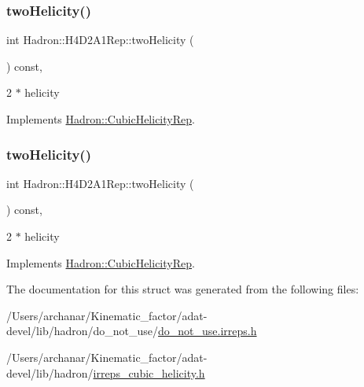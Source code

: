 \subsubsection{\texorpdfstring{twoHelicity()}{twoHelicity()}\hspace{0.1cm}{\footnotesize\ttfamily [2/3]}}
{\footnotesize\ttfamily int Hadron\+::\+H4\+D2\+A1\+Rep\+::two\+Helicity (\begin{DoxyParamCaption}{ }\end{DoxyParamCaption}) const\hspace{0.3cm}{\ttfamily [inline]}, {\ttfamily [virtual]}}

2 $\ast$ helicity 

Implements \mbox{\hyperlink{structHadron_1_1CubicHelicityRep_af507aa56fc2747eacc8cb6c96db31ecc}{Hadron\+::\+Cubic\+Helicity\+Rep}}.

\mbox{\label{structHadron_1_1H4D2A1Rep_ade522129ee7018a431237c9d04e13351}} 
\subsubsection{\texorpdfstring{twoHelicity()}{twoHelicity()}\hspace{0.1cm}{\footnotesize\ttfamily [3/3]}}
{\footnotesize\ttfamily int Hadron\+::\+H4\+D2\+A1\+Rep\+::two\+Helicity (\begin{DoxyParamCaption}{ }\end{DoxyParamCaption}) const\hspace{0.3cm}{\ttfamily [inline]}, {\ttfamily [virtual]}}

2 $\ast$ helicity 

Implements \mbox{\hyperlink{structHadron_1_1CubicHelicityRep_af507aa56fc2747eacc8cb6c96db31ecc}{Hadron\+::\+Cubic\+Helicity\+Rep}}.



The documentation for this struct was generated from the following files\+:\begin{DoxyCompactItemize}
\item 
/\+Users/archanar/\+Kinematic\+\_\+factor/adat-\/devel/lib/hadron/do\+\_\+not\+\_\+use/\mbox{\hyperlink{adat-devel_2lib_2hadron_2do__not__use_2do__not__use_8irreps_8h}{do\+\_\+not\+\_\+use.\+irreps.\+h}}\item 
/\+Users/archanar/\+Kinematic\+\_\+factor/adat-\/devel/lib/hadron/\mbox{\hyperlink{adat-devel_2lib_2hadron_2irreps__cubic__helicity_8h}{irreps\+\_\+cubic\+\_\+helicity.\+h}}\end{DoxyCompactItemize}
